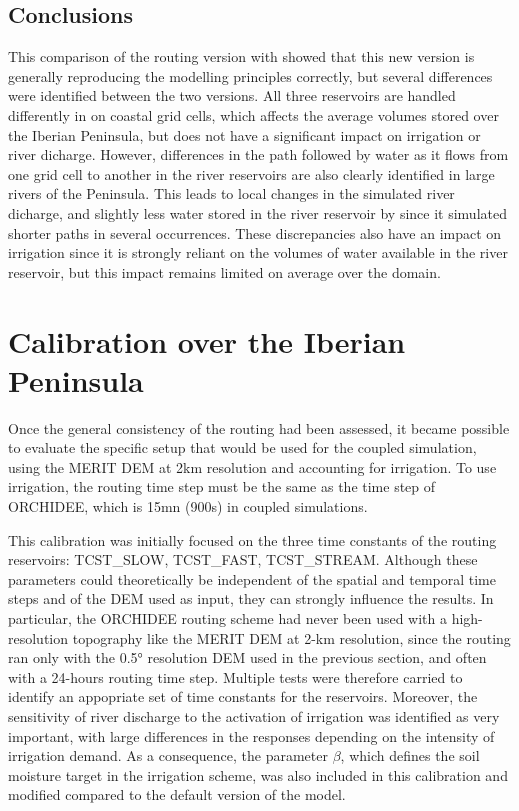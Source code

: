 \subsection{Conclusions}

This comparison of the \native routing version with \std showed that this new version is generally reproducing the modelling principles correctly, but several differences were identified between the two versions. All three reservoirs are handled differently in \native on coastal grid cells, which affects the average volumes stored over the Iberian Peninsula, but does not have a significant impact on irrigation or river dicharge. However, differences in the path followed by water as it flows from one grid cell to another in the river reservoirs are also clearly identified in large rivers of the Peninsula. This leads to local changes in the simulated river dicharge, and slightly less water stored in the river reservoir by \native since it simulated shorter paths in several occurrences. These discrepancies also have an impact on irrigation since it is strongly reliant on the volumes of water available in the river reservoir, but this impact remains limited on average over the domain.

\section{Calibration over the Iberian Peninsula}
\label{section:calib}

Once the general consistency of the \native routing had been assessed, it became possible to evaluate the specific setup that would be used for the coupled simulation, using the MERIT DEM at 2km resolution and accounting for irrigation. To use irrigation, the routing time step must be the same as the time step of ORCHIDEE, which is 15mn (900s) in coupled simulations. 

This calibration was initially focused on the three time constants of the routing reservoirs: TCST\_SLOW, TCST\_FAST, TCST\_STREAM. Although these parameters could theoretically be independent of the spatial and temporal time steps and of the DEM used as input, they can strongly influence the results. In particular, the ORCHIDEE routing scheme had never been used with a high-resolution topography like the MERIT DEM at 2-km resolution, since the \std routing ran only with the 0.5° resolution DEM used in the previous section, and often with a 24-hours routing time step. Multiple tests were therefore carried to identify an appopriate set of time constants for the reservoirs.
Moreover, the sensitivity of river discharge to the activation of irrigation was identified as very important, with large differences in the responses depending on the intensity of irrigation demand. As a consequence, the parameter $\beta$, which defines the soil moisture target in the irrigation scheme, was also included in this calibration and modified compared to the default version of the model.

